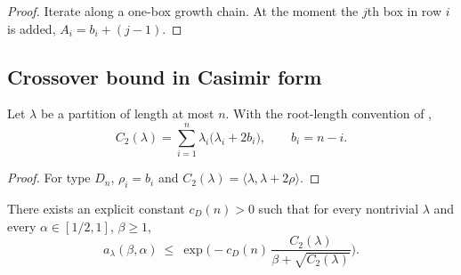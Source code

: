 \begin{proof}
Iterate  along a one-box growth chain.
At the moment the $j$th box in row $i$ is added, $A_i=b_i+(j-1)$.
\end{proof}

\subsection{Crossover bound in Casimir form}
\label{subsec:A1_Spin_even_crossover}

\begin{lemma}
\label{lem:SOeven_casimir}
Let $\lambda$ be a partition of length at most $n$.
With the root-length convention of ,
\begin{equation}
\label{eq:SOeven_casimir_formula}
C_2(\lambda)=\sum_{i=1}^n \lambda_i\big(\lambda_i+2b_i\big),\qquad b_i=n-i.
\end{equation}
\end{lemma}

\begin{proof}
For type $D_n$, $\rho_i=b_i$ and $C_2(\lambda)=\langle\lambda,\lambda+2\rho\rangle$.
\end{proof}

\begin{proposition}
\label{prop:SOeven_A1_final}
There exists an explicit constant $c_{D}(n)>0$ such that for every nontrivial $\lambda$ and every $\alpha\in[1/2,1]$, $\beta\ge 1$,
\begin{equation}
\label{eq:SOeven_A1_final}
 a_{\lambda}(\beta,\alpha)
\ \le\
\exp\Big(-c_{D}(n)\,\frac{C_2(\lambda)}{\beta+\sqrt{C_2(\lambda)}}\Big).
\end{equation}
\end{proposition}

